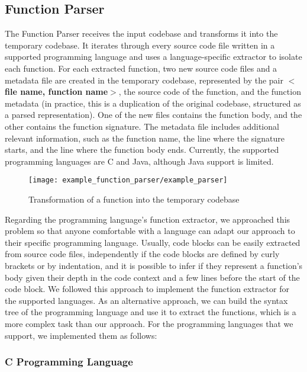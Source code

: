 \subsection{Function Parser}

The Function Parser receives the input codebase and transforms it into the temporary
codebase. It iterates through every source code file written in a supported programming 
language and uses a language-specific extractor to isolate each function. For each extracted 
function, two new source code files and a metadata file are created in the temporary codebase, 
represented by the pair \textbf{$<$file name, function name$>$}, the source code of the function, 
and the function metadata (in practice, this is a duplication of the original codebase, 
structured as a parsed representation). One of the new files contains the function body, and the other 
contains the function signature. The metadata file includes additional relevant information,
such as the function name, the line where the signature starts, and the line where the function 
body ends. Currently, the supported programming languages are C and Java, although Java support is limited.

\begin{figure}
\texttt{[image: example\_function\_parser/example\_parser]}
\caption{Transformation of a function into the temporary codebase}
\label{fig:transform}
\end{figure}

Regarding the programming language's function extractor, we approached this problem so that anyone comfortable with a language can adapt our approach to their specific programming language. Usually, code blocks can be easily extracted from source code files, independently if the code blocks are defined by curly brackets or by indentation, and it is possible to infer if they represent a function's body given their depth in the code context and a few lines before the start of the code block. We followed this approach to implement the function extractor for the supported languages. As an alternative approach, we can build the syntax tree \citep{compiler} of the programming language and use it to extract the functions, which is a more complex task than our approach. For the programming languages that we support, we implemented them as follows:

\subsubsection{C Programming Language}

